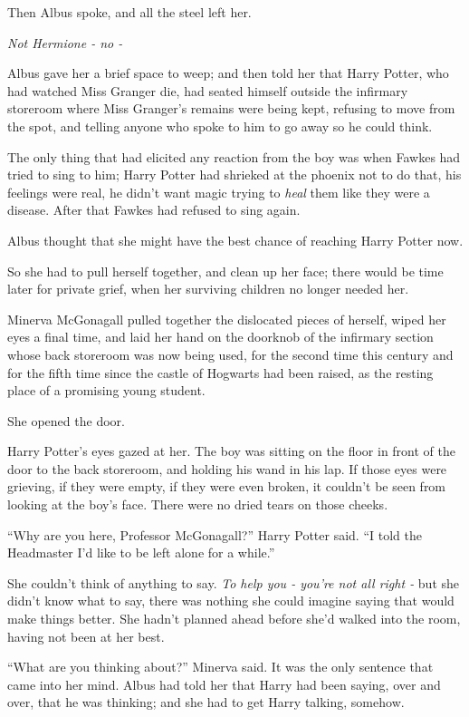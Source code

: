 Then Albus spoke, and all the steel left her.

\emph{Not Hermione - no -}

Albus gave her a brief space to weep; and then told her that Harry
Potter, who had watched Miss Granger die, had seated himself outside the
infirmary storeroom where Miss Granger's remains were being kept,
refusing to move from the spot, and telling anyone who spoke to him to
go away so he could think.

The only thing that had elicited any reaction from the boy was when
Fawkes had tried to sing to him; Harry Potter had shrieked at the
phoenix not to do that, his feelings were real, he didn't want magic
trying to \emph{heal} them like they were a disease. After that Fawkes
had refused to sing again.

Albus thought that she might have the best chance of reaching Harry
Potter now.

So she had to pull herself together, and clean up her face; there would
be time later for private grief, when her surviving children no longer
needed her.

Minerva McGonagall pulled together the dislocated pieces of herself,
wiped her eyes a final time, and laid her hand on the doorknob of the
infirmary section whose back storeroom was now being used, for the
second time this century and for the fifth time since the castle of
Hogwarts had been raised, as the resting place of a promising young
student.

She opened the door.

Harry Potter's eyes gazed at her. The boy was sitting on the floor in
front of the door to the back storeroom, and holding his wand in his
lap. If those eyes were grieving, if they were empty, if they were even
broken, it couldn't be seen from looking at the boy's face. There were
no dried tears on those cheeks.

``Why are you here, Professor McGonagall?'' Harry Potter said. ``I told
the Headmaster I'd like to be left alone for a while.''

She couldn't think of anything to say. \emph{To help you - you're not
all right -} but she didn't know what to say, there was nothing she
could imagine saying that would make things better. She hadn't planned
ahead before she'd walked into the room, having not been at her best.

``What are you thinking about?'' Minerva said. It was the only sentence
that came into her mind. Albus had told her that Harry had been saying,
over and over, that he was thinking; and she had to get Harry talking,
somehow.


